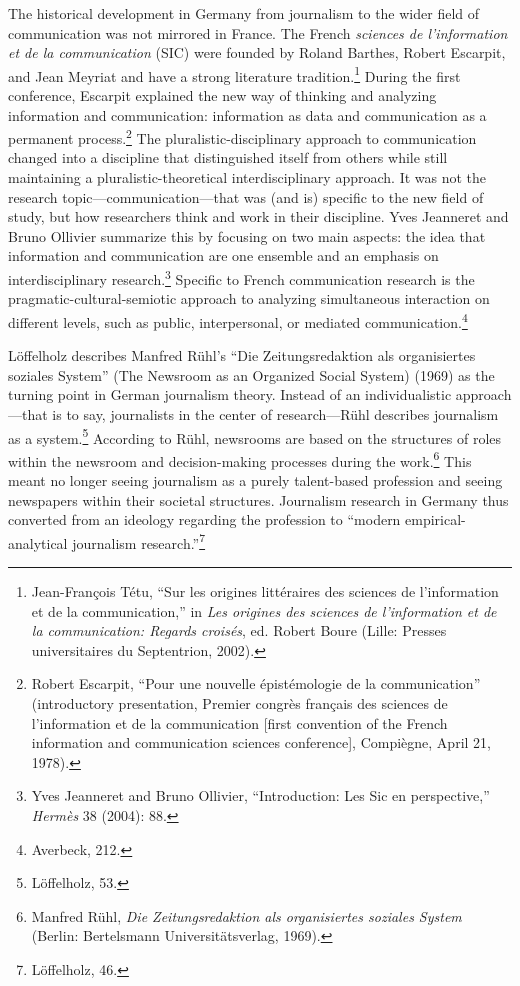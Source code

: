 \documentclass{tufte-handout}
\begin{document}
The historical development in Germany from journalism to the wider field
of communication was not mirrored in France. The French \emph{sciences
de l'information et de la communication} (SIC) were founded by Roland
Barthes, Robert Escarpit, and Jean Meyriat and have a strong literature
tradition.\footnote{Jean-François Tétu, ``Sur les origines littéraires
  des sciences de l'information et de la communication,'' in \emph{Les
  origines des sciences de l'information et de la communication: Regards
  croisés}, ed. Robert Boure (Lille: Presses universitaires du
  Septentrion, 2002).} During the first conference, Escarpit explained
the new way of thinking and analyzing information and communication:
information as data and communication as a permanent process.\footnote{Robert
  Escarpit, ``Pour une nouvelle épistémologie de la communication''
  (introductory presentation, Premier congrès français des sciences de
  l'information et de la communication {[}first convention of the French
  information and communication sciences conference{]}, Compiègne, April
  21, 1978).} The pluralistic-disciplinary approach to communication
changed into a discipline that distinguished itself from others while
still maintaining a pluralistic-theoretical interdisciplinary approach.
It was not the research topic---communication---that was (and is)
specific to the new field of study, but how researchers think and work
in their discipline. Yves Jeanneret and Bruno Ollivier summarize this by
focusing on two main aspects: the idea that information and
communication are one ensemble and an emphasis on interdisciplinary
research.\footnote{Yves Jeanneret and Bruno Ollivier, ``Introduction:
  Les Sic en perspective,'' \emph{Hermès} 38 (2004): 88.} Specific to
French communication research is the pragmatic-cultural-semiotic
approach to analyzing simultaneous interaction on different levels, such
as public, interpersonal, or mediated communication.\footnote{Averbeck,
  212.}

Löffelholz describes Manfred Rühl's ``Die Zeitungsredaktion als
organisiertes soziales System'' (The Newsroom as an Organized Social
System) (1969) as the turning point in German journalism theory. Instead
of an individualistic approach---that is to say, journalists in the
center of research---Rühl describes journalism as a system.\footnote{Löffelholz,
  53.} According to Rühl, newsrooms are based on the structures of roles
within the newsroom and decision-making processes during the
work.\footnote{Manfred Rühl, \emph{Die Zeitungsredaktion als
  organisiertes soziales System} (Berlin: Bertelsmann
  Universitätsverlag, 1969).} This meant no longer seeing journalism as
a purely talent-based profession and seeing newspapers within their
societal structures. Journalism research in Germany thus converted from
an ideology regarding the profession to ``modern empirical-analytical
journalism research.''\footnote{Löffelholz, 46.}
\end{document}
